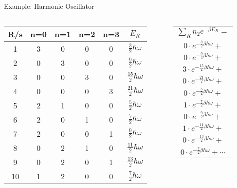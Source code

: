 \documentclass{beamer}
\begin{document}
\begin{frame}{Example: Harmonic Oscillator}
	\begin{columns}
		\begin{column}{0.5\textwidth}
	\renewcommand{\arraystretch}{1.5}
	\setlength{\tabcolsep}{1pt}
	\begin{tabular}{|c|c|c|c|c|c|}
		\hline
		R/s&n=0&n=1&n=2&n=3&$E_R$\\
		\hline
		1&3&0&0&0&$\frac{3}{2}\hbar\omega$\\
		\hline
		2&0&3&0&0&$\frac{9}{2}\hbar\omega$\\
		\hline
		3&0&0&3&0&$\frac{15}{2}\hbar\omega$\\
		\hline
		4&0&0&0&3&$\frac{21}{2}\hbar\omega$\\
		\hline
		5&2&1&0&0&$\frac{5}{2}\hbar\omega$\\
		\hline
		6&2&0&1&0&$\frac{7}{2}\hbar\omega$\\
		\hline
		7&2&0&0&1&$\frac{9}{2}\hbar\omega$\\
		\hline
		8&0&2&1&0&$\frac{11}{2}\hbar\omega$\\
		\hline
		9&0&2&0&1&$\frac{13}{2}\hbar\omega$\\
		\hline
		10&1&2&0&0&$\frac{7}{2}\hbar\omega$\\
		\hline
	\end{tabular}
		\end{column}
	\begin{column}{0.5\textwidth}
	\renewcommand{\arraystretch}{1.5}
\setlength{\tabcolsep}{1pt}
\begin{tabular}{c}
$\sum_{R}n_2e^{-\beta E_R}=$\\
$0\cdot e^{-\frac{3}{2}\beta \hbar \omega}+$\\
$0\cdot e^{-\frac{9}{2}\beta \hbar \omega}+$\\
$3\cdot e^{-\frac{15}{2}\beta \hbar \omega}+$\\
$0\cdot e^{-\frac{21}{2}\beta \hbar \omega}+$\\
$0\cdot e^{-\frac{5}{2}\beta \hbar \omega}+$\\
$1\cdot e^{-\frac{7}{2}\beta \hbar \omega}+$\\
$0\cdot e^{-\frac{9}{2}\beta \hbar \omega}+$\\
$1\cdot e^{-\frac{11}{2}\beta \hbar \omega}+$\\
$0\cdot e^{-\frac{13}{2}\beta \hbar \omega}+$\\
$0\cdot e^{-\frac{7}{2}\beta \hbar \omega}+\cdots$
\end{tabular}
	\end{column}
	\end{columns}
\end{frame}
\end{document}
